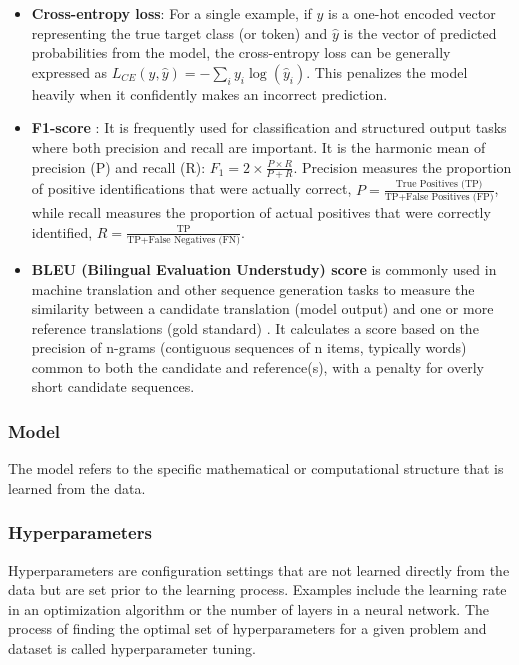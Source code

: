 \begin{itemize}
    \item \textbf{Cross-entropy loss}:  For a single example, if $y$ is a one-hot encoded vector representing the true target class (or token) and $\hat{y}$ is the vector of predicted probabilities from the model, the cross-entropy loss can be generally expressed as $L_{CE}(y, \hat{y}) = - \sum_i y_i \log(\hat{y}_i)$. This penalizes the model heavily when it confidently makes an incorrect prediction.
    \item \textbf{F1-score} \cite{lipton2014thresholding}: It is frequently used for classification and structured output tasks where both precision and recall are important. It is the harmonic mean of precision (P) and recall (R): $F_1 = 2 \times \frac{P \times R}{P + R}$. Precision measures the proportion of positive identifications that were actually correct, $P = \frac{\text{True Positives (TP)}}{\text{TP} + \text{False Positives (FP)}}$, while recall measures the proportion of actual positives that were correctly identified, $R = \frac{\text{TP}}{\text{TP} + \text{False Negatives (FN)}}$.
    \item \textbf{BLEU (Bilingual Evaluation Understudy) score} is commonly used in machine translation and other sequence generation tasks to measure the similarity between a candidate translation (model output) and one or more reference translations (gold standard) \cite{papineni2002bleu}. It calculates a score based on the precision of n-grams (contiguous sequences of n items, typically words) common to both the candidate and reference(s), with a penalty for overly short candidate sequences.
\end{itemize}

\subsubsection{Model}
The model refers to the specific mathematical or computational structure that is learned from the data.

\subsubsection{Hyperparameters}
Hyperparameters are configuration settings that are not learned directly from the data but are set prior to the learning process. Examples include the learning rate in an optimization algorithm or the number of layers in a neural network. The process of finding the optimal set of hyperparameters for a given problem and dataset is called hyperparameter tuning.


